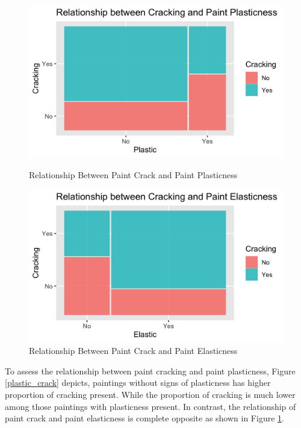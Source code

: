 \documentclass[11pt, oneside]{article}
\begin{document}
\begin{figure}[H]
    \centering
    \captionsetup{justification=centering}
    \begin{minipage}{0.5\textwidth}
        \centering
        \includegraphics[width=1\textwidth]{images/plastic_crack.png} 
        \caption{Relationship Between Paint Crack and Paint Plasticness}
        \label{plastic_crack}
    \end{minipage}\hfill
    \begin{minipage}{0.5\textwidth}
        \centering
        \includegraphics[width=1\textwidth]{images/elastic_crack.png} 
        \caption{Relationship Between Paint Crack and Paint Elasticness}
        \label{elastic_crack}
    \end{minipage}
\end{figure}

\noindent To assess the relationship between paint cracking and paint plasticness, Figure \ref{plastic_crack} depicts, paintings without signs of plasticness has higher proportion of cracking present. While the proportion of cracking is much lower among those paintings with plasticness present. In contrast, the relationship of paint crack and paint elasticness is complete opposite as shown in Figure \ref{elastic_crack}.
\end{document}
